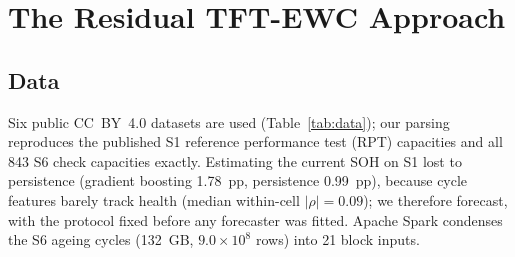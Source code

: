 %

\section{The Residual TFT-EWC Approach}
\label{sec:methods}

\subsection{Data}
\label{sec:data}

Six public CC~BY~4.0 datasets are used (Table~\ref{tab:data}); our parsing reproduces the published S1 reference performance test (RPT) capacities and all 843 S6 check capacities exactly. Estimating the current SOH on S1 lost to persistence (gradient boosting 1.78~pp, persistence 0.99~pp), because cycle features barely track health (median within-cell $|\rho|=0.09$); we therefore forecast, with the protocol fixed before any forecaster was fitted. Apache Spark condenses the S6 ageing cycles (132~GB, $9.0\times10^{8}$ rows) into 21 block inputs.

